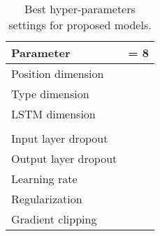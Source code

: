 \documentclass[11pt,a4paper]{article}
\begin{document}
    \vspace{0.5cm}
    
	\begin{table}[ht!]
		\ContinuedFloat 
			\begin{subtable}[h]{0.4\textwidth}
	             \begin{tabular}{|l|r|}
	                 \hline 
	                 Parameter &  = 8 \\
	                 \hline \hline
	                 Position dimension   &  \\
	                 Type dimension 	  &  \\
	                 LSTM dimension 	  &  \\
	                 				  &  \\
	                 Input layer dropout 	  &  \\
	                 Output layer dropout 	  &  \\
	                 Learning rate 			  &  \\
	                 Regularization 		  &   \\
	                 Gradient clipping		  &  \\
	                 \hline
	             \end{tabular}
             	 \subcaption{}
             	 \label{tab:params_e}
 			\end{subtable}
            
 		\caption{Best hyper-parameters settings for proposed models.}
 		\label{tab:params}
	\end{table}
        
\end{document}
